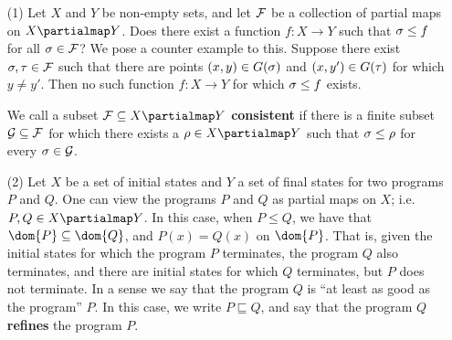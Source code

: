 \begin{example}\label{example_1.5}
  \begin{enumerate}
    \item[(1)] Let $X$ and $Y$ be non-empty sets, and let $\mathcal{F}$ be a
      collection of partial maps on  $X \partialmap Y$. Does there
      exist a function $f:X \xrightarrow{} Y$ such that $\sigma \leq f$
      for all $\sigma \in \mathcal{F}$? We pose a counter example to this. Suppose
      there exist $\sigma,\tau \in \mathcal{F}$ such that there are points $(x,y)
      \in G(\sigma)$ and $(x,y') \in G(\tau)$ for which $y \neq y'$. Then no
      such function $f:X \xrightarrow{} Y$ for which $\sigma \leq f$
      exists.

      We call a subset $\Fc \subseteq X \partialmap Y$
      \textbf{consistent} if there is a finite subset $\mathcal{G} \subseteq
      \mathcal{F}$ for which there exists a $\r \in X \partialmap Y$ such that
      $\sigma \leq \rho$ for every $\sigma \in \mathcal{G}$.

    \item[(2)] Let $X$ be a set of initial states and  $Y$ a set of
      final states for two programs  $P$ and $Q$. One can view the
      programs $P$ and $Q$ as partial maps on $X$; i.e.  $P,Q \in X
      \partialmap Y$. In this case, when $P \leq Q$, we have that
      $\dom{P} \subseteq \dom{Q}$, and $P(x)=Q(x)$ on $\dom{P}$. That
      is, given the initial states for which the program $P$
      terminates, the program $Q$ also terminates, and there are
      initial states for which $Q$ terminates, but $P$ does not
      terminate. In a sense we say that the program $Q$ is ``at least
      as good as the program'' $P$.  In this case, we write $P
      \sqsubseteq Q$, and say that the program $Q$ \textbf{refines}
      the program $P$.
  \end{enumerate}
\end{example}

